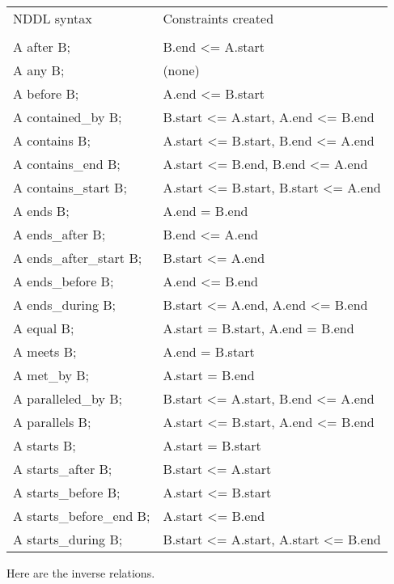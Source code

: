\documentclass[10pt, letterpaper, twoside]{article}
\begin{document}
{\begin{tabular}{ll}
NDDL syntax & Constraints created \\
\cline{1-2} \\
A after B; & B.end <= A.start \\
A any B; & (none) \\
A before B; & A.end <= B.start \\
A contained\_by B; & B.start <= A.start, A.end <= B.end \\
A contains B; & A.start <= B.start, B.end <= A.end \\
A contains\_end B; & A.start <= B.end, B.end <= A.end \\
A contains\_start B; & A.start <= B.start, B.start <= A.end \\
A ends B; & A.end = B.end \\
A ends\_after B; & B.end <= A.end \\
A ends\_after\_start B; & B.start <= A.end \\
A ends\_before B; & A.end <= B.end \\
A ends\_during B; & B.start <= A.end, A.end <= B.end \\
A equal B; & A.start = B.start, A.end = B.end \\
A meets B; & A.end = B.start \\
A met\_by B; & A.start = B.end \\
A paralleled\_by B; & B.start <= A.start, B.end <= A.end \\
A parallels B; & A.start <= B.start, A.end <= B.end \\
A starts B; & A.start = B.start \\
A starts\_after B; & B.start <= A.start \\
A starts\_before B; & A.start <= B.start \\
A starts\_before\_end B; & A.start <= B.end \\
A starts\_during B; & B.start <= A.start, A.start <= B.end \\
\end{tabular}

Here are the inverse relations.

}
\end{document}
